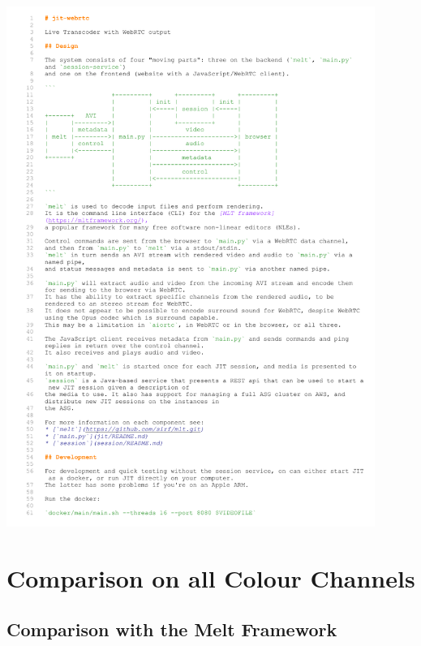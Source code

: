 \documentclass[../MasterThesis.tex]{subfiles}
\begin{document}
\includegraphics[page=2, width=0.9\textwidth]{BE.pdf}













\newpage
\section{Comparison on all Colour Channels} \label{appendix:comparisonRGB}

\captionsetup{font=small}

\subsection*{Comparison with the Melt Framework}
\end{document}
